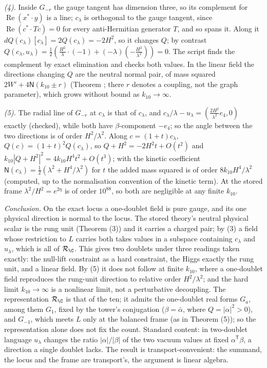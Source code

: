 \emph{(4).} Inside $G_{-r}$ the gauge tangent has dimension three, so its complement for $\operatorname{Re}(x^{*}\cdot y)$ is a line; $c_{\lambda}$ is orthogonal to the gauge tangent, since $\operatorname{Re}(c^{*}\cdot Tc) = 0$ for every anti-Hermitian generator $T$, and so spans it. Along it $dQ(c_{\lambda})[c_{\lambda}] = 2Q(c_{\lambda}) = -2H^{2}$, so it changes $Q$; by contrast $Q(c_{\lambda}, u_{\lambda}) = \tfrac12(\tfrac{H^{2}}{\lambda}\cdot(-1) + (-\lambda)(-\tfrac{H^{2}}{\lambda^{2}})) = 0$. The script finds the complement by exact elimination and checks both values. In the linear field the directions changing $Q$ are the neutral normal pair, of mass squared $2W' + 4\mathsf{N}(k_{10} \pm r)$ (Theorem ; there $r$ denotes a coupling, not the graph parameter), which grows without bound as $k_{10} \to \infty$.

\emph{(5).} The radial line of $G_{-r}$ at $c_{\lambda}$ is that of $c_{\lambda}$, and $c_{\lambda}/\lambda - u_{\lambda} = (\tfrac{2H^{2}}{\lambda^{2}}e_{4}, 0)$ exactly (checked), while both have $\beta$-component $-e_{4}$; so the angle between the two directions is of order $H^{2}/\lambda^{2}$. Along $c = (1 + t)c_{\lambda}$, $Q(c) = (1 + t)^{2}Q(c_{\lambda})$, so $Q + H^{2} = -2H^{2}t + O(t^{2})$ and $k_{10}|Q + H^{2}|^{2} = 4k_{10}H^{4}t^{2} + O(t^{3})$; with the kinetic coefficient $\mathsf{N}(c_{\lambda}) = \tfrac12(\lambda^{2} + H^{4}/\lambda^{2})$ for $t$ the added mass squared is of order $8k_{10}H^{4}/\lambda^{2}$ (computed, up to the normalisation convention of the kinetic term). At the stored frame $\lambda^{2}/H^{2} = e^{2\eta}$ is of order $10^{88}$, so both are negligible at any finite $k_{10}$.

\emph{Conclusion.} On the exact locus a one-doublet field is pure gauge, and its one physical direction is normal to the locus. The stored theory's neutral physical scalar is the rung unit (Theorem (3)) and it carries a charged pair; by (3) a field whose restriction to $L$ carries both takes values in a subspace containing $c_{\lambda}$ and $u_{\lambda}$, which is all of $\mathcal{R}_{\C}$. This gives two doublets under three readings taken exactly: the null-lift constraint as a hard constraint, the Higgs exactly the rung unit, and a linear field. By (5) it does not follow at finite $k_{10}$, where a one-doublet field reproduces the rung-unit direction to relative order $H^{2}/\lambda^{2}$; and the hard limit $k_{10} \to \infty$ is a nonlinear limit, not a perturbative decoupling. The representation $\mathcal{R}_{\C}$ is that of the ten; it admits the one-doublet real forms $G_{a}$, among them $G_{1}$, fixed by the tower's conjugation ($\beta = \bar{\alpha}$, where $Q = |\alpha|^{2} > 0$), and $G_{-1}$, which meets $L$ only at the balanced frame (as in Theorem (5)); so the representation alone does not fix the count. Standard content: in two-doublet language $u_{\lambda}$ changes the ratio $|\alpha|/|\beta|$ of the two vacuum values at fixed $\alpha^{\mathsf T}\beta$, a direction a single doublet lacks. The result is transport-convenient: the summand, the locus and the frame are transport's, the argument is linear algebra.
